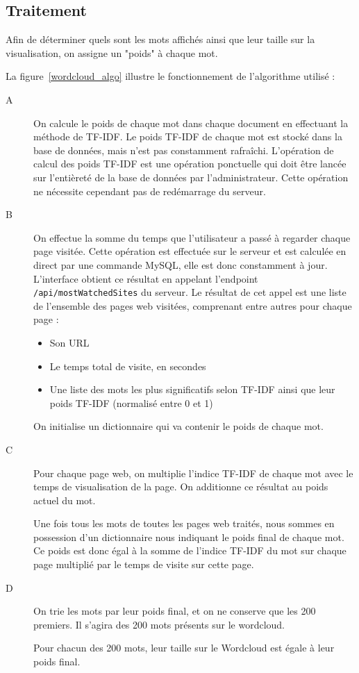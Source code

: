 	\subsection{Traitement}

		Afin de déterminer quels sont les mots affichés ainsi que leur taille sur la visualisation, on assigne un "poids" à chaque mot.

		La figure~\ref{wordcloud_algo} illustre le fonctionnement de l'algorithme utilisé :
		\begin{description}
			\item[A] On calcule le poids de chaque mot dans chaque document en effectuant la méthode de TF-IDF. Le poids TF-IDF de chaque mot est stocké dans la base de données, mais n'est pas constamment rafraîchi. L'opération de calcul des poids TF-IDF est une opération ponctuelle qui doit être lancée sur l'entièreté de la base de données par l'administrateur. Cette opération ne nécessite cependant pas de redémarrage du serveur.

			\item[B] On effectue la somme du temps que l'utilisateur a passé à regarder chaque page visitée. Cette opération est effectuée sur le serveur et est calculée en direct par une commande MySQL, elle est donc constamment à jour. L'interface obtient ce résultat en appelant l'endpoint \texttt{/api/mostWatchedSites} du serveur. Le résultat de cet appel est une liste de l'ensemble des pages web visitées, comprenant entre autres pour chaque page : 
			\begin{itemize}
				\item Son URL
				\item Le temps total de visite, en secondes
				\item Une liste des mots les plus significatifs selon TF-IDF ainsi que leur poids TF-IDF (normalisé entre 0 et 1)
			\end{itemize}
			
			On initialise un dictionnaire qui va contenir le poids de chaque mot.

			\item[C] Pour chaque page web, on multiplie l'indice TF-IDF de chaque mot avec le temps de visualisation de la page. On additionne ce résultat au poids actuel du mot.
			
			Une fois tous les mots de toutes les pages web traités, nous sommes en possession d'un dictionnaire nous indiquant le poids final de chaque mot. Ce poids est donc égal à la somme de l'indice TF-IDF du mot sur chaque page multiplié par le temps de visite sur cette page.
			
			\item[D] On trie les mots par leur poids final, et on ne conserve que les 200 premiers. Il s'agira des 200 mots présents sur le wordcloud.
			
			Pour chacun des 200 mots, leur taille sur le Wordcloud est égale à leur poids final.
		\end{description}

